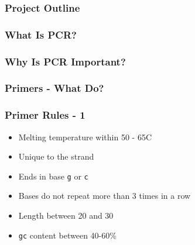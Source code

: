 \frame{\titlepage}
\begin{frame}
\frametitle{Project Outline}
\end{frame}    

\begin{frame}
\frametitle{What Is PCR?}
\end{frame}

\begin{frame}
\frametitle{Why Is PCR Important?}
\end{frame}

\begin{frame}
\frametitle{Primers - What Do?}
\end{frame}

\begin{frame}
\frametitle{Primer Rules - 1}

\begin{itemize}
\item Melting temperature within 50 - 65\degree C
\item Unique to the strand
\item Ends in base \texttt{g} or \texttt{c}
\item Bases do not repeat more than 3 times in a row
\item Length between 20 and 30
\item \texttt{gc} content between 40-60\%
\end{itemize}

\end{frame}
     
